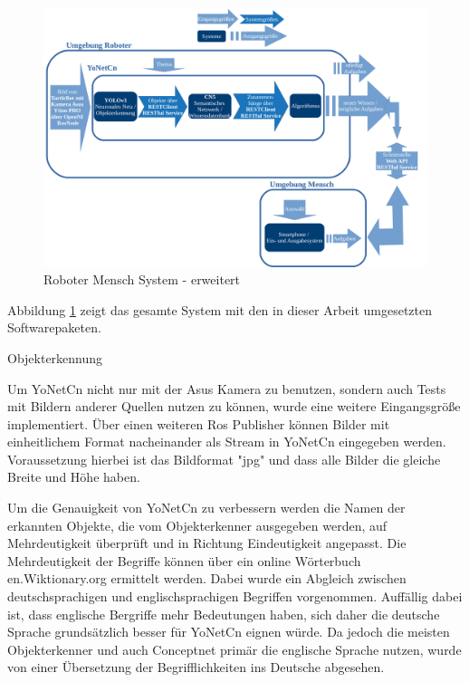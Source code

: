 \begin{figure}[h]
	
	\begin{center}
		
		\includegraphics[width=16cm]{images/Masteridee_4.png}
		
		\caption{Roboter Mensch System - erweitert}
		
		\label{Roboter_Mensch_System2}
		
	\end{center}
	
	
\end{figure}

Abbildung \ref{Roboter_Mensch_System2} zeigt das gesamte System mit den in dieser Arbeit umgesetzten Softwarepaketen. 

Objekterkennung

Um YoNetCn nicht nur mit der Asus Kamera zu benutzen, sondern auch Tests mit Bildern anderer Quellen nutzen zu können, wurde eine weitere Eingangsgröße implementiert. Über einen weiteren Ros Publisher können Bilder mit einheitlichem Format nacheinander als Stream in YoNetCn eingegeben werden. Voraussetzung hierbei ist das Bildformat "jpg" und dass alle Bilder die gleiche Breite und Höhe haben. 

Um die Genauigkeit von YoNetCn zu verbessern werden die Namen der erkannten Objekte, die vom Objekterkenner ausgegeben werden, auf Mehrdeutigkeit überprüft und in Richtung Eindeutigkeit angepasst. Die Mehrdeutigkeit der Begriffe können über ein online Wörterbuch en.Wiktionary.org ermittelt werden. Dabei wurde ein Abgleich zwischen deutschsprachigen und englischsprachigen Begriffen vorgenommen. Auffällig dabei ist, dass englische Bergriffe mehr Bedeutungen haben, sich daher die deutsche Sprache grundsätzlich besser für YoNetCn eignen würde. Da jedoch die meisten Objekterkenner und auch Conceptnet primär die englische Sprache nutzen, wurde von einer Übersetzung der Begrifflichkeiten ins Deutsche abgesehen. 

